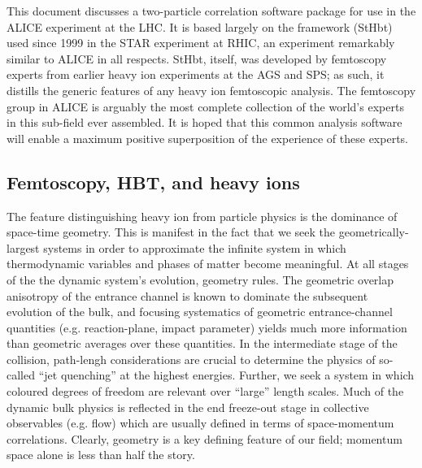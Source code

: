 \documentclass[twoside]{article}
\begin{document}
This document discusses a two-particle correlation software package for use in the ALICE experiment
at the LHC.  It is based largely on the framework (StHbt) used since 1999 in the STAR experiment at
RHIC, an experiment remarkably similar to ALICE in all respects.  StHbt, itself, was developed by
femtoscopy experts from earlier heavy ion experiments at the AGS and SPS; as such, it distills the
generic features of any heavy ion femtoscopic analysis.  The femtoscopy group in ALICE is arguably
the most complete collection of the world's experts in this sub-field ever assembled.  It is hoped
that this common analysis software will enable a maximum positive superposition of the experience
of these experts.


\subsection{Femtoscopy, HBT, and heavy ions}

The feature distinguishing heavy ion from particle physics is the dominance of space-time
geometry.  
This is manifest in the fact that we seek the geometrically-largest systems in order to approximate
the infinite system in which thermodynamic variables and phases of matter become meaningful.
At all stages of the the dynamic system's evolution, geometry rules.
The geometric overlap anisotropy of the entrance channel is known to dominate the subsequent
evolution of the bulk, and focusing systematics of geometric entrance-channel quantities
(e.g. reaction-plane, impact parameter) yields much more information than geometric averages
over these quantities.  In the intermediate stage of the collision, path-lengh considerations
are crucial to determine the physics of so-called ``jet quenching'' at the highest energies.
Further, we seek a system in which coloured degrees of freedom
are relevant over ``large'' length scales.  Much of the dynamic bulk physics is reflected in the
end freeze-out stage in collective observables (e.g. flow) which are usually defined in terms
of space-momentum correlations.
Clearly, geometry is a key defining feature of our field; momentum space alone is less than
half the story.
\end{document}
